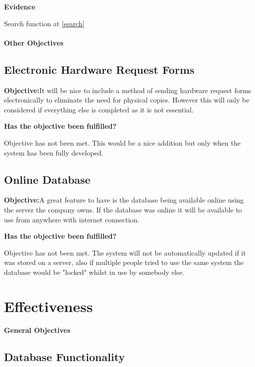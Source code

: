 \textbf{Evidence}

Search function at \ref{search}


\paragraph{Other Objectives}

\subsection{Electronic Hardware Request Forms}

\textbf{Objective:}It will be nice to include a method of sending hardware request forms electronically to eliminate the need for physical copies. However this will only be considered if everything else is completed as it is not essential.

\textbf{Has the objective been fulfilled?}

Objective has not been met. This would be a nice addition but only when the system has been fully developed.



\subsection{Online Database}

\textbf{Objective:}A great feature to have is the database being available online using the server the company owns. If the database was online it will be available to use from anywhere with internet connection.

\textbf{Has the objective been fulfilled?}

Objective has not been met. The system will not be automatically updated if it was stored on a server, also if multiple people tried to use the same system the database would be "locked" whilst in use by somebody else.


\section{Effectiveness}

\paragraph{General Objectives}

\subsection{Database Functionality}\label{staffhardware}

